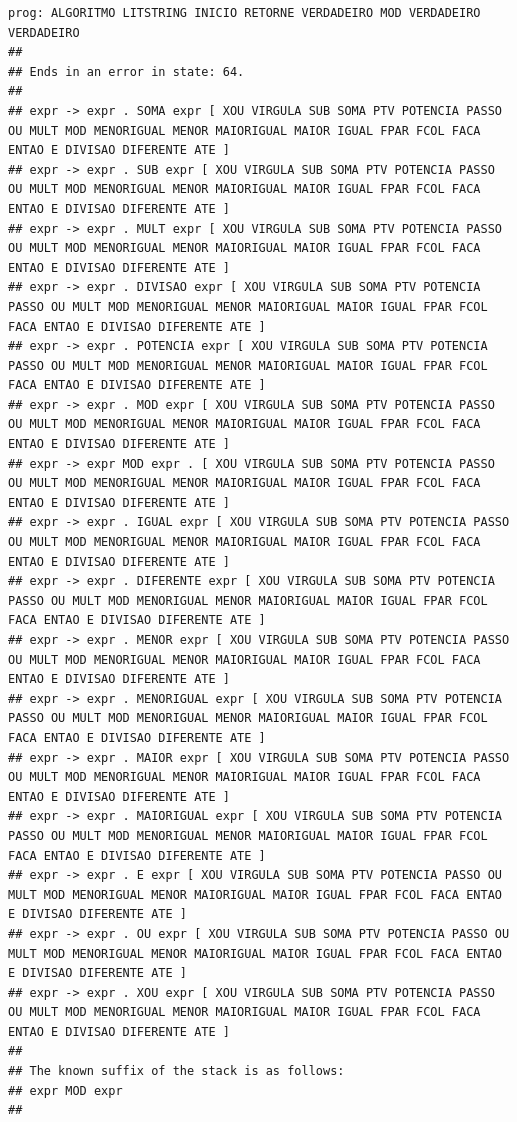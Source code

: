 \documentclass[hidelinks,12pt]{article}
\begin{document}
\begin{lstlisting}
prog: ALGORITMO LITSTRING INICIO RETORNE VERDADEIRO MOD VERDADEIRO VERDADEIRO 
##
## Ends in an error in state: 64.
##
## expr -> expr . SOMA expr [ XOU VIRGULA SUB SOMA PTV POTENCIA PASSO OU MULT MOD MENORIGUAL MENOR MAIORIGUAL MAIOR IGUAL FPAR FCOL FACA ENTAO E DIVISAO DIFERENTE ATE ]
## expr -> expr . SUB expr [ XOU VIRGULA SUB SOMA PTV POTENCIA PASSO OU MULT MOD MENORIGUAL MENOR MAIORIGUAL MAIOR IGUAL FPAR FCOL FACA ENTAO E DIVISAO DIFERENTE ATE ]
## expr -> expr . MULT expr [ XOU VIRGULA SUB SOMA PTV POTENCIA PASSO OU MULT MOD MENORIGUAL MENOR MAIORIGUAL MAIOR IGUAL FPAR FCOL FACA ENTAO E DIVISAO DIFERENTE ATE ]
## expr -> expr . DIVISAO expr [ XOU VIRGULA SUB SOMA PTV POTENCIA PASSO OU MULT MOD MENORIGUAL MENOR MAIORIGUAL MAIOR IGUAL FPAR FCOL FACA ENTAO E DIVISAO DIFERENTE ATE ]
## expr -> expr . POTENCIA expr [ XOU VIRGULA SUB SOMA PTV POTENCIA PASSO OU MULT MOD MENORIGUAL MENOR MAIORIGUAL MAIOR IGUAL FPAR FCOL FACA ENTAO E DIVISAO DIFERENTE ATE ]
## expr -> expr . MOD expr [ XOU VIRGULA SUB SOMA PTV POTENCIA PASSO OU MULT MOD MENORIGUAL MENOR MAIORIGUAL MAIOR IGUAL FPAR FCOL FACA ENTAO E DIVISAO DIFERENTE ATE ]
## expr -> expr MOD expr . [ XOU VIRGULA SUB SOMA PTV POTENCIA PASSO OU MULT MOD MENORIGUAL MENOR MAIORIGUAL MAIOR IGUAL FPAR FCOL FACA ENTAO E DIVISAO DIFERENTE ATE ]
## expr -> expr . IGUAL expr [ XOU VIRGULA SUB SOMA PTV POTENCIA PASSO OU MULT MOD MENORIGUAL MENOR MAIORIGUAL MAIOR IGUAL FPAR FCOL FACA ENTAO E DIVISAO DIFERENTE ATE ]
## expr -> expr . DIFERENTE expr [ XOU VIRGULA SUB SOMA PTV POTENCIA PASSO OU MULT MOD MENORIGUAL MENOR MAIORIGUAL MAIOR IGUAL FPAR FCOL FACA ENTAO E DIVISAO DIFERENTE ATE ]
## expr -> expr . MENOR expr [ XOU VIRGULA SUB SOMA PTV POTENCIA PASSO OU MULT MOD MENORIGUAL MENOR MAIORIGUAL MAIOR IGUAL FPAR FCOL FACA ENTAO E DIVISAO DIFERENTE ATE ]
## expr -> expr . MENORIGUAL expr [ XOU VIRGULA SUB SOMA PTV POTENCIA PASSO OU MULT MOD MENORIGUAL MENOR MAIORIGUAL MAIOR IGUAL FPAR FCOL FACA ENTAO E DIVISAO DIFERENTE ATE ]
## expr -> expr . MAIOR expr [ XOU VIRGULA SUB SOMA PTV POTENCIA PASSO OU MULT MOD MENORIGUAL MENOR MAIORIGUAL MAIOR IGUAL FPAR FCOL FACA ENTAO E DIVISAO DIFERENTE ATE ]
## expr -> expr . MAIORIGUAL expr [ XOU VIRGULA SUB SOMA PTV POTENCIA PASSO OU MULT MOD MENORIGUAL MENOR MAIORIGUAL MAIOR IGUAL FPAR FCOL FACA ENTAO E DIVISAO DIFERENTE ATE ]
## expr -> expr . E expr [ XOU VIRGULA SUB SOMA PTV POTENCIA PASSO OU MULT MOD MENORIGUAL MENOR MAIORIGUAL MAIOR IGUAL FPAR FCOL FACA ENTAO E DIVISAO DIFERENTE ATE ]
## expr -> expr . OU expr [ XOU VIRGULA SUB SOMA PTV POTENCIA PASSO OU MULT MOD MENORIGUAL MENOR MAIORIGUAL MAIOR IGUAL FPAR FCOL FACA ENTAO E DIVISAO DIFERENTE ATE ]
## expr -> expr . XOU expr [ XOU VIRGULA SUB SOMA PTV POTENCIA PASSO OU MULT MOD MENORIGUAL MENOR MAIORIGUAL MAIOR IGUAL FPAR FCOL FACA ENTAO E DIVISAO DIFERENTE ATE ]
##
## The known suffix of the stack is as follows:
## expr MOD expr 
##


\end{lstlisting}
\end{document}

